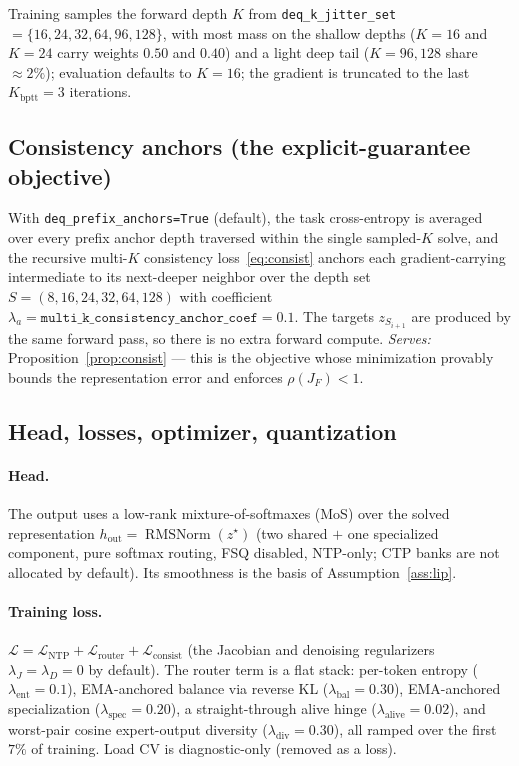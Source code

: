 \documentclass[11pt]{article}
\newcommand{\RMSNorm}{\operatorname{RMSNorm}}
\newcommand{\rhoF}{\rho(J_F)}
\newcommand{\code}[1]{\texttt{#1}}
\begin{document}
Training samples the forward depth $K$ from \code{deq\_k\_jitter\_set}
$=\{16,24,32,64,96,128\}$, with most mass on the shallow depths ($K{=}16$ and $K{=}24$ carry
weights $0.50$ and $0.40$) and a light deep tail ($K{=}96,128$ share $\approx2\%$); evaluation
defaults to $K{=}16$; the gradient is truncated to the last $K_{\mathrm{bptt}}{=}3$ iterations.

\subsection{Consistency anchors (the explicit-guarantee objective)}
\label{sec:anchors}

With \code{deq\_prefix\_anchors=True} (default), the task cross-entropy is averaged over every
prefix anchor depth traversed within the single sampled-$K$ solve, and the recursive multi-$K$
consistency loss~\eqref{eq:consist} anchors each gradient-carrying intermediate to its
next-deeper neighbor over the depth set $S=(8,16,24,32,64,128)$ with coefficient
$\lambda_a=\code{multi\_k\_consistency\_anchor\_coef}=0.1$.  The targets $z_{S_{i+1}}$ are produced
by the same forward pass, so there is no extra forward compute.  \emph{Serves:}
Proposition~\ref{prop:consist} --- this is the objective whose minimization provably bounds the
representation error and enforces $\rhoF<1$.

\subsection{Head, losses, optimizer, quantization}
\label{sec:rest}

\paragraph{Head.} The output uses a low-rank mixture-of-softmaxes (MoS) over the solved
representation $h_{\mathrm{out}}=\RMSNorm(z^\star)$ (two shared $+$ one specialized component, pure
softmax routing, FSQ disabled, NTP-only; CTP banks are not allocated by default).  Its smoothness
is the basis of Assumption~\ref{ass:lip}.

\paragraph{Training loss.} $\mathcal L=\mathcal L_{\mathrm{NTP}}+\mathcal L_{\mathrm{router}}+\mathcal L_{\mathrm{consist}}$
(the Jacobian and denoising regularizers $\lambda_J=\lambda_D=0$ by default).  The router term is a
flat stack: per-token entropy ($\lambda_{\mathrm{ent}}=0.1$), EMA-anchored balance via reverse
KL ($\lambda_{\mathrm{bal}}=0.30$), EMA-anchored specialization ($\lambda_{\mathrm{spec}}=0.20$),
a straight-through alive hinge ($\lambda_{\mathrm{alive}}=0.02$), and worst-pair cosine expert-output
diversity ($\lambda_{\mathrm{div}}=0.30$), all ramped over the first $7\%$ of training.  Load CV is
diagnostic-only (removed as a loss).
\end{document}
